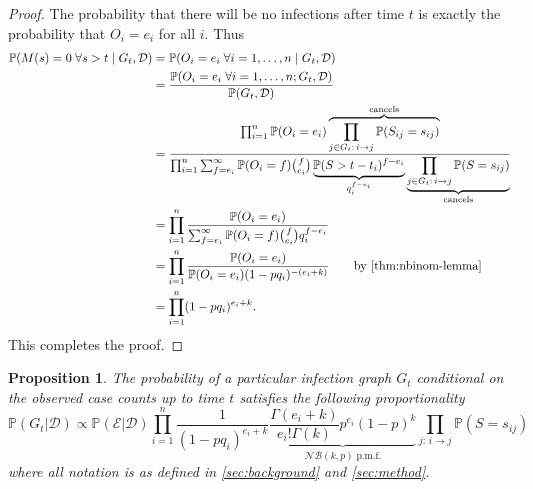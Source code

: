 \documentclass{article}
\newtheorem{proposition}{Proposition}[section]
\begin{document}
\begin{proof}
The probability that there will be no infections after time \(t\) is exactly the probability that \(O_i = e_i\) for all \(i\). Thus
\begin{align*}
\mathbb{P}(M(s) = 0 \;\forall s > t \;|\; G_t, \mathcal{D})
&= \mathbb{P}(O_i = e_i \;\forall i=1,\dots,n \;|\; G_t, \mathcal{D}) \\
&= \frac{\mathbb{P}(O_i = e_i \;\forall i=1,\dots,n ; G_t, \mathcal{D})}{\mathbb{P}(G_t, \mathcal{D})} \\
&= \frac{
    \prod_{i=1}^n \mathbb{P}(O_i = e_i) \overbrace{\prod_{j \in G_t :\, i \to j} \mathbb{P}(S_{ij} = s_{ij})}^{\text{cancels}}
}{
    \prod_{i=1}^n \sum_{f=e_i}^\infty \mathbb{P}(O_i = f) \binom{f}{e_i} \underbrace{\mathbb{P}(S > t-t_i)^{f-e_i}}_{q_i^{f-e_i}} \underbrace{\prod_{j \in G_t :\, i \to j} \mathbb{P}(S = s_{ij})}_{\text{cancels}}
} \\
&= \prod_{i=1}^n \frac{
    \mathbb{P}(O_i = e_i)
}{
    \sum_{f=e_i}^\infty \mathbb{P}(O_i = f) \binom{f}{e_i} q_i^{f-e_i}
} \\
&= \prod_{i=1}^n \frac{\mathbb{P}(O_i = e_i)}{\mathbb{P}(O_i = e_i) (1-pq_i)^{-(e_i+k)}} \qquad\text{by \Cref{thm:nbinom-lemma}} \\
&= \prod_{i=1}^n (1 - pq_i)^{e_i + k}.
\end{align*}
This completes the proof.
\end{proof}

\begin{proposition}\label{thm:conditional-graph-prob}
The probability of a particular infection graph \(G_t\) conditional on the observed case counts up to time \(t\) satisfies the following proportionality
\[
\mathbb{P}(G_t | \mathcal{D}) \propto 
\mathbb{P}(\mathcal{E} | \mathcal{D}) \prod_{i=1}^n \frac{1}{(1-pq_i)^{e_i + k}} \underbrace{\frac{\Gamma(e_i + k)}{e_i! \Gamma(k)} p^{e_i} (1-p)^k}_{\mathcal{NB}(k, p) \;\text{p.m.f.}} \prod_{j:\, i \to j} \mathbb{P}(S = s_{ij})
\]
where all notation is as defined in \autoref{sec:background} and \autoref{sec:method}.
\end{proposition}
\end{document}
